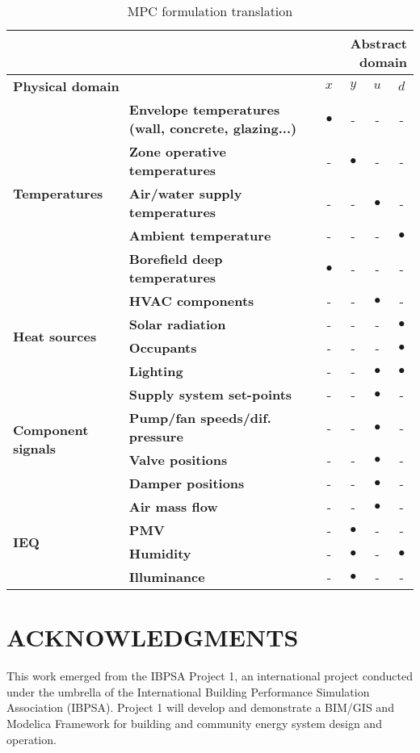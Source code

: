 \documentclass[10pt]{extarticle}
\begin{document}
\begin{table}[b]
\centering
\caption{MPC formulation translation}
\begin{tabular}{l|l|cccc}
\toprule
\multicolumn{2}{r}{}  & \multicolumn{4}{r}{\textbf{Abstract domain}} \\
\toprule
\multicolumn{2}{l}{\textbf{Physical domain}} & \textbf{$x$} & \textbf{$y$} & \textbf{$u$} & \textbf{$d$} \\ 
\midrule
\multirow{5}{*}{\textbf{Temperatures}} & \textbf{Envelope temperatures (wall, concrete, glazing...)} & $\bullet$ & - & - & - \\ 
& \textbf{Zone operative temperatures} & - & $\bullet$ & - & - \\
& \textbf{Air/water supply temperatures} & - & - & $\bullet$ & - \\
& \textbf{Ambient temperature} & - & - & - & $\bullet$ \\
& \textbf{Borefield deep temperatures} & $\bullet$ & - & - & - \\
\midrule
\multirow{4}{*}{\textbf{Heat sources}} &
\textbf{HVAC components} & - & - & $\bullet$ & - \\
& \textbf{Solar radiation} & - & - & - & $\bullet$ \\
& \textbf{Occupants} & - & - & - & $\bullet$ \\
& \textbf{Lighting} & - & - & $\bullet$ & $\bullet$ \\
\midrule
\multirow{4}{*}{\textbf{Component signals}} &
\textbf{Supply system set-points} & - & - & $\bullet$ & - \\
& \textbf{Pump/fan speeds/dif. pressure} & - & - & $\bullet$ & - \\
& \textbf{Valve positions} & - & - & $\bullet$ & - \\
& \textbf{Damper positions} & - & - & $\bullet$ & - \\
\midrule
\multirow{4}{*}{\textbf{IEQ}} &
 \textbf{Air mass flow} & - & - & $\bullet$ & - \\
& \textbf{PMV} & - & $\bullet$ & - & - \\
& \textbf{Humidity} & - & $\bullet$ & - & $\bullet$ \\
& \textbf{Illuminance} & - & $\bullet$ & - & - \\
\bottomrule 
\end{tabular}
\end{table} 






\vspace{24pt}


\section*{ACKNOWLEDGMENTS}

This work emerged from the IBPSA Project 1, an international project conducted under the umbrella of the International Building Performance Simulation Association (IBPSA). Project 1 will develop and demonstrate a BIM/GIS and Modelica Framework for building and community energy system design and operation.
\end{document}
